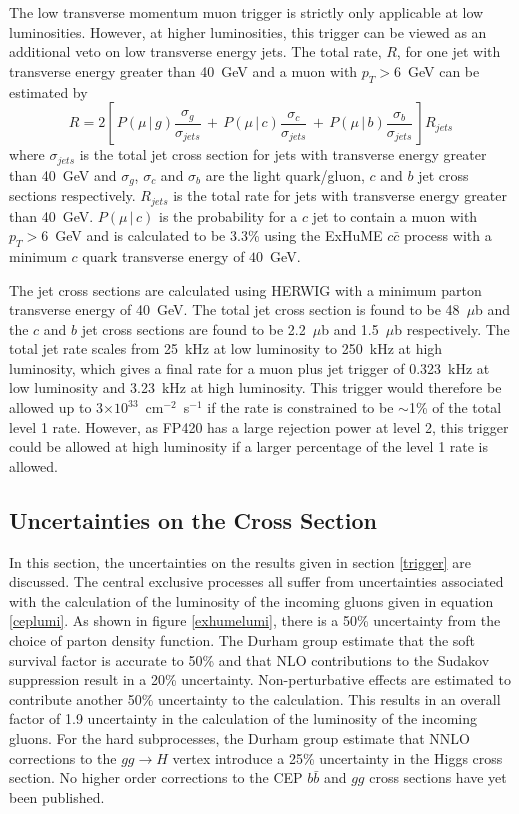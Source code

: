 The low transverse momentum muon trigger is strictly only applicable at low luminosities. However, at higher luminosities, this trigger can be viewed as an additional veto on low transverse energy jets. The total rate, $R$, for one jet with transverse energy greater than 40~GeV and a muon with $p_T>6$~GeV can be estimated by
\begin{equation}
R =  2\left[ \, P(\mu \, | \, g) \frac{\sigma_g}{\sigma_{jets}} \, 
+ \, P(\mu \, | \, c )\frac{\sigma_c}{\sigma_{jets}} \, 
+ \, P(\mu \, | \, b)\frac{\sigma_b}{\sigma_{jets}} \, \right] R_{jets}
\end{equation}
where $\sigma_{jets}$ is the total jet cross section for jets with transverse energy greater than 40~GeV and $\sigma_g$, $\sigma_c$ and $\sigma_b$ are the light quark/gluon, $c$ and $b$ jet cross sections respectively. $R_{jets}$ is the total rate for jets with transverse energy greater than 40~GeV.  $P(\mu \, | \, c )$ is the probability for a $c$ jet to contain a muon with $p_T>6$~GeV and is calculated to be 3.3\% using the ExHuME $c\bar{c}$ process with a minimum $c$ quark transverse energy of $40$~GeV. 

The jet cross sections are calculated using HERWIG with a minimum parton transverse energy of 40~GeV. The total jet cross section is found to be 48~$\mu$b and the $c$ and $b$ jet cross sections are found to be 2.2~$\mu$b and 1.5~$\mu$b respectively. The total jet rate scales from 25~kHz at low luminosity to 250~kHz at high luminosity, which gives a final rate for a muon plus jet trigger of 0.323~kHz at low luminosity and 3.23~kHz at high luminosity. This trigger would therefore be allowed up to 3$\times10^{33}$~cm$^{-2}$~s$^{-1}$ if the rate is constrained to be $\sim$1\% of the total level 1 rate. However, as FP420 has a large rejection power at level 2, this trigger could be allowed at high luminosity if a larger percentage of the level 1 rate is allowed.


\subsection{Uncertainties on the Cross Section}\label{higgsxsuncertainties}

In this section, the uncertainties on the results given in section \ref{trigger} are discussed. 
The central exclusive processes all suffer from uncertainties associated with the calculation of the luminosity of the incoming gluons given in equation \ref{ceplumi}. As shown in figure \ref{exhumelumi}, there is a 50\% uncertainty from the choice of parton density function.  The Durham group estimate \cite{DeRoeck:2002hk} that the soft survival factor is accurate to 50\% and that NLO contributions to the Sudakov suppression result in a  20\% uncertainty. Non-perturbative effects are estimated to contribute another 50\% uncertainty to the calculation. This results in an overall factor of 1.9  uncertainty in the calculation of the luminosity of the incoming gluons.  
For the hard subprocesses, the Durham group estimate that NNLO corrections to the $gg \rightarrow H$ vertex introduce a 25\% uncertainty in the Higgs cross section. No higher order corrections to the CEP $b\bar{b}$ and $gg$ cross sections have yet been published.

